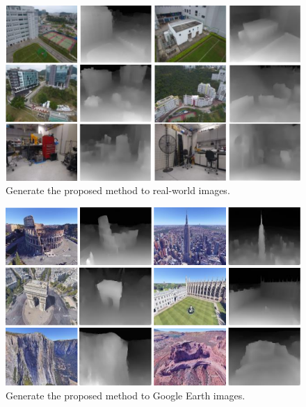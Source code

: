 \documentclass[letterpaper, 10 pt, conference]{ieeeconf}  %
\begin{document}
\begin{figure}[t]
\begin{center}
\vspace{0.3cm}
\includegraphics[width=0.95\linewidth]{figs/main_paper_dji.pdf}
\end{center}
\vspace{-0.5cm}
\caption{Generate the proposed method to real-world images.}
\label{fig:real_world_dji}
\vspace{-0.3cm}
\end{figure}

\begin{figure}[t]
\begin{center}
\includegraphics[width=0.95\linewidth]{figs/main_paper_google.pdf}
\end{center}
\vspace{-0.4cm}
\caption{Generate the proposed method to Google Earth images.}
\label{fig:real_world_google}
\vspace{-0.5cm}
\end{figure}
\end{document}
